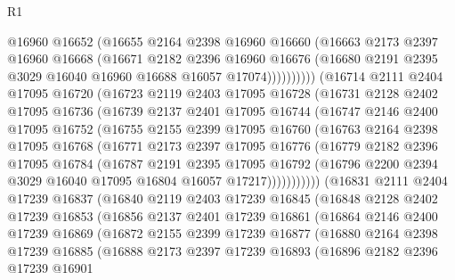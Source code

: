 \begin{lexlean}{R1}
\begin{coremodule}
                @16960
                @16652
                (@16655
                  @2164
                  @2398
                  @16960
                  @16660
                  (@16663
                    @2173
                    @2397
                    @16960
                    @16668
                    (@16671
                      @2182
                      @2396
                      @16960
                      @16676
                      (@16680 @2191 @2395 @3029 @16040 @16960 @16688 @16057 @17074))))))))))
    (@16714
      @2111
      @2404
      @17095
      @16720
      (@16723
        @2119
        @2403
        @17095
        @16728
        (@16731
          @2128
          @2402
          @17095
          @16736
          (@16739
            @2137
            @2401
            @17095
            @16744
            (@16747
              @2146
              @2400
              @17095
              @16752
              (@16755
                @2155
                @2399
                @17095
                @16760
                (@16763
                  @2164
                  @2398
                  @17095
                  @16768
                  (@16771
                    @2173
                    @2397
                    @17095
                    @16776
                    (@16779
                      @2182
                      @2396
                      @17095
                      @16784
                      (@16787
                        @2191
                        @2395
                        @17095
                        @16792
                        (@16796 @2200 @2394 @3029 @16040 @17095 @16804 @16057 @17217)))))))))))
    (@16831
      @2111
      @2404
      @17239
      @16837
      (@16840
        @2119
        @2403
        @17239
        @16845
        (@16848
          @2128
          @2402
          @17239
          @16853
          (@16856
            @2137
            @2401
            @17239
            @16861
            (@16864
              @2146
              @2400
              @17239
              @16869
              (@16872
                @2155
                @2399
                @17239
                @16877
                (@16880
                  @2164
                  @2398
                  @17239
                  @16885
                  (@16888
                    @2173
                    @2397
                    @17239
                    @16893
                    (@16896
                      @2182
                      @2396
                      @17239
                      @16901

\end{coremodule}
\end{lexlean}
